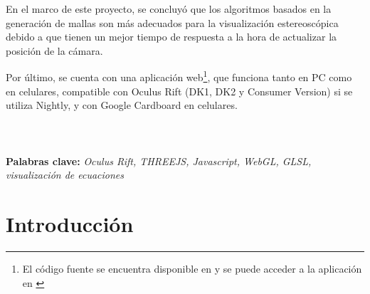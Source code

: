 \documentclass[12pt]{article}
\begin{document}
En el marco de este proyecto, se concluyó que los algoritmos basados en la generación de mallas son más adecuados para la visualización estereoscópica debido a que tienen un mejor tiempo de respuesta a la hora de actualizar la posición de la cámara.

Por último, se cuenta con una aplicación web\footnote{El código fuente se encuentra disponible en \cite{nuestrocodigo} y se puede acceder a la aplicación en \cite{nuestrositio}}, que funciona  tanto en PC como en celulares,  compatible con Oculus Rift (DK1, DK2 y Consumer Version) si se utiliza Nightly, y con Google Cardboard en celulares.
\\
\\
\\
\\
\textbf{Palabras clave:} \textit{Oculus Rift, THREEJS, Javascript, WebGL, GLSL, visualización de ecuaciones} 


\clearpage
\tableofcontents
\clearpage
\section{Introducción}
\end{document}
